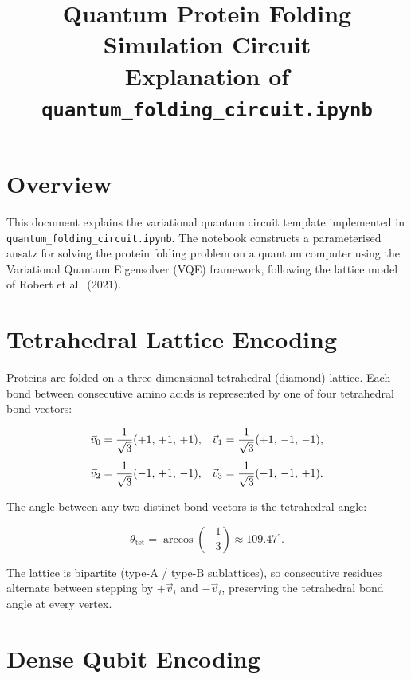 \documentclass[11pt,a4paper]{article}
\title{Quantum Protein Folding Simulation Circuit \\[4pt]
       \large Explanation of \texttt{quantum\_folding\_circuit.ipynb}}
\author{}
\date{}
\begin{document}
\maketitle

\section{Overview}

This document explains the variational quantum circuit template implemented in
\texttt{quantum\_folding\_circuit.ipynb}. The notebook constructs a parameterised
ansatz for solving the protein folding problem on a quantum computer using the
Variational Quantum Eigensolver (VQE) framework, following the lattice model of
Robert et al.\ (2021).

\section{Tetrahedral Lattice Encoding}

Proteins are folded on a three-dimensional tetrahedral (diamond) lattice. Each
bond between consecutive amino acids is represented by one of four tetrahedral
bond vectors:

\begin{align}
  \vec{v}_0 &= \frac{1}{\sqrt{3}}(+1,\,+1,\,+1), &
  \vec{v}_1 &= \frac{1}{\sqrt{3}}(+1,\,-1,\,-1), \notag\\[4pt]
  \vec{v}_2 &= \frac{1}{\sqrt{3}}(-1,\,+1,\,-1), &
  \vec{v}_3 &= \frac{1}{\sqrt{3}}(-1,\,-1,\,+1).
\end{align}

The angle between any two distinct bond vectors is the tetrahedral angle:

\begin{equation}
  \theta_{\mathrm{tet}}
    = \arccos\!\left(-\frac{1}{3}\right)
    \approx 109.47^{\circ}.
\end{equation}

The lattice is bipartite (type-A / type-B sublattices), so consecutive residues
alternate between stepping by $+\vec{v}_i$ and $-\vec{v}_i$, preserving the
tetrahedral bond angle at every vertex.

\section{Dense Qubit Encoding}
\end{document}
